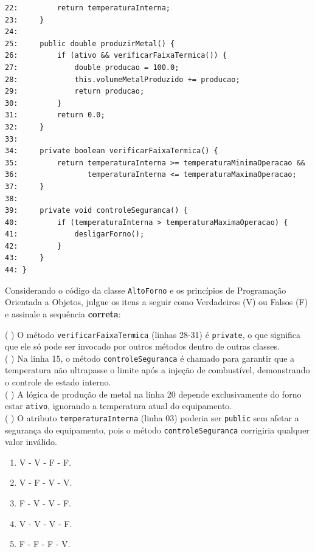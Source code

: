 \documentclass[12pt,a4paper]{article}
\begin{document}
\begin{enumerate}
\begin{small}
\begin{lstlisting}
22:         return temperaturaInterna;
23:     }
24: 
25:     public double produzirMetal() {
26:         if (ativo && verificarFaixaTermica()) {
27:             double producao = 100.0;
28:             this.volumeMetalProduzido += producao;
29:             return producao;
30:         }
31:         return 0.0;
32:     }
33: 
34:     private boolean verificarFaixaTermica() {
35:         return temperaturaInterna >= temperaturaMinimaOperacao && 
36:                temperaturaInterna <= temperaturaMaximaOperacao;
37:     }
38: 
39:     private void controleSeguranca() {
40:         if (temperaturaInterna > temperaturaMaximaOperacao) {
41:             desligarForno();
42:         }
43:     }
44: }
\end{lstlisting}
\end{small}

    Considerando o código da classe \texttt{AltoForno} e os princípios de Programação Orientada a Objetos, julgue os itens a seguir como Verdadeiros (V) ou Falsos (F) e assinale a sequência \textbf{correta}:

    ( ) O método \texttt{verificarFaixaTermica} (linhas 28-31) é \texttt{private}, o que significa que ele só pode ser invocado por outros métodos dentro de outras classes. \\
    ( ) Na linha 15, o método \texttt{controleSeguranca} é chamado para garantir que a temperatura não ultrapasse o limite após a injeção de combustível, demonstrando o controle de estado interno. \\
    ( ) A lógica de produção de metal na linha 20 depende exclusivamente do forno estar \texttt{ativo}, ignorando a temperatura atual do equipamento. \\
    ( ) O atributo \texttt{temperaturaInterna} (linha 03) poderia ser \texttt{public} sem afetar a segurança do equipamento, pois o método \texttt{controleSeguranca} corrigiria qualquer valor inválido.

    \begin{enumerate}[label=\Alph*)]
        \item V - V - F - F.
        \item V - F - V - V.
        \item F - V - V - F.
        \item V - V - V - F.
        \item F - F - F - V.
    \end{enumerate}



\end{enumerate}
\end{document}
